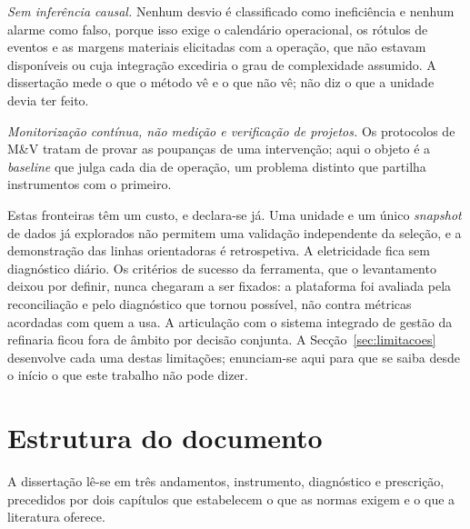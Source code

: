 \emph{Sem inferência causal.} Nenhum desvio é classificado como
ineficiência e nenhum alarme como falso, porque isso exige o calendário
operacional, os rótulos de eventos e as margens materiais elicitadas
com a operação, que não estavam disponíveis ou cuja integração excediria o grau de complexidade assumido. A dissertação mede o que o
método vê e o que não vê; não diz o que a unidade devia ter feito.

\emph{Monitorização contínua, não medição e verificação de projetos.}
Os protocolos de M\&V tratam de provar as poupanças de uma intervenção;
aqui o objeto é a \emph{baseline} que julga cada dia de operação, um
problema distinto que partilha instrumentos com o primeiro.

Estas fronteiras têm um custo, e declara-se já. Uma unidade e um único
\emph{snapshot} de dados já explorados não permitem uma validação
independente da seleção, e a demonstração das linhas orientadoras é
retrospetiva.  A
eletricidade fica sem diagnóstico diário. Os
critérios de sucesso da ferramenta, que o levantamento deixou por
definir, nunca chegaram a ser fixados: a plataforma foi avaliada pela
reconciliação e pelo diagnóstico que tornou possível, não contra
métricas acordadas com quem a usa. A articulação com o sistema integrado
de gestão da refinaria ficou fora de âmbito por decisão conjunta. A
Secção~\ref{sec:limitacoes} desenvolve cada uma destas limitações;
enunciam-se aqui para que se saiba desde o início o que este trabalho
não pode dizer.

\section{Estrutura do documento}
\label{sec:estrutura}

A dissertação lê-se em três andamentos, instrumento, diagnóstico e
prescrição, precedidos por dois capítulos que estabelecem o que as
normas exigem e o que a literatura oferece.


